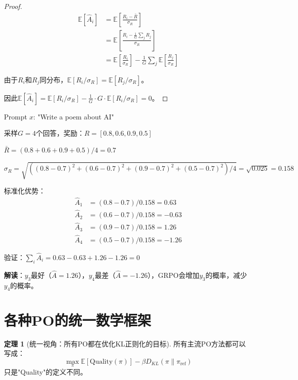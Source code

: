 \documentclass[11pt,a4paper]{article}
\theoremstyle{definition}
\newtheorem{theorem}{定理}[section]
\begin{document}
\begin{proof}
\begin{align*}
\mathbb{E}[\hat{A}_i] &= \mathbb{E}\left[\frac{R_i - \bar{R}}{\sigma_R}\right] \\
&= \mathbb{E}\left[\frac{R_i - \frac{1}{G}\sum_j R_j}{\sigma_R}\right] \\
&= \mathbb{E}\left[\frac{R_i}{\sigma_R}\right] - \frac{1}{G}\sum_j \mathbb{E}\left[\frac{R_j}{\sigma_R}\right]
\end{align*}

由于$R_i$和$R_j$同分布，$\mathbb{E}[R_i/\sigma_R] = \mathbb{E}[R_j/\sigma_R]$。

因此$\mathbb{E}[\hat{A}_i] = \mathbb{E}[R_i/\sigma_R] - \frac{1}{G} \cdot G \cdot \mathbb{E}[R_i/\sigma_R] = 0$。
\end{proof}

\begin{calculation}[GRPO的数值例子]
Prompt $x$: "Write a poem about AI"

采样$G = 4$个回答，奖励：$R = [0.8, 0.6, 0.9, 0.5]$

$\bar{R} = (0.8 + 0.6 + 0.9 + 0.5) / 4 = 0.7$

$\sigma_R = \sqrt{((0.8-0.7)^2 + (0.6-0.7)^2 + (0.9-0.7)^2 + (0.5-0.7)^2)/4} = \sqrt{0.025} = 0.158$

标准化优势：
\begin{align*}
\hat{A}_1 &= (0.8 - 0.7) / 0.158 = 0.63 \\
\hat{A}_2 &= (0.6 - 0.7) / 0.158 = -0.63 \\
\hat{A}_3 &= (0.9 - 0.7) / 0.158 = 1.26 \\
\hat{A}_4 &= (0.5 - 0.7) / 0.158 = -1.26
\end{align*}

验证：$\sum_i \hat{A}_i = 0.63 - 0.63 + 1.26 - 1.26 = 0$ \checkmark

\textbf{解读}：$y_3$最好（$\hat{A} = 1.26$），$y_4$最差（$\hat{A} = -1.26$），GRPO会增加$y_3$的概率，减少$y_4$的概率。
\end{calculation}

\section{各种PO的统一数学框架}

\begin{theorem}[统一视角：所有PO都在优化KL正则化的目标]
所有主流PO方法都可以写成：
\[
\max_\pi \mathbb{E}[\text{Quality}(\pi)] - \beta D_{KL}(\pi \| \pi_{\text{ref}})
\]
只是"Quality"的定义不同。
\end{theorem}
\end{document}
